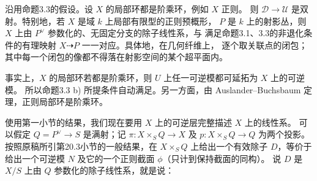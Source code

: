 \begingroup
\def\newscope{V-L}
\def\depth{\operatorname{depth}}
\def\Spec{\operatorname{Spec}}
\def\Ass{\operatorname{Ass}}
\def\OO{\mathcal O}
\def\FF{\mathcal F}
\def\JJ{\mathcal J}

沿用命题3.3的假设。设 \(X\) 的局部环都是阶乘环，例如 \(X\) 正则。
则 \(\mathcal D\to\mathcal U\) 是双射。特别地，若 \(X\) 是域 \(k\) 上局部有限型的正则预概形，
\(P\) 是 \(k\) 上的射影丛，则 \(X\) 上由 \(P^\vee\) 参数化的、无固定分支的除子线性系，与
满足命题3.1、3.3的非退化条件的有理映射 \(X\dashrightarrow P\) 一一对应。具体地，在几何纤维上，
逐个取关联点的闭包；其中每一个闭包的像都不得落在射影空间的某个超平面内。

事实上，\(X\) 的局部环若都是阶乘环，则 \(U\) 上任一可逆模都可延拓为 \(X\) 上的可逆模。
所以命题3.3 b) 所提条件自动满足。另一方面，由 Auslander--Buchsbaum 定理，正则局部环是阶乘环。

使用第一小节的结果，我们现在要用 \(X\) 上的可逆层完整描述 \(X\) 上的线性系。
可以假定 \(Q=P^\vee\to S\) 是满射；记 \(\pi:X\times_S Q\to X\) 及 \(p:X\times_S Q\to Q\) 为两个投影。
按照原稿所引第20.3小节的一般结果，在 \(X\times_S Q\) 上给出一个有效除子 \(D\)，等价于给出一个可逆模 \(N\) 及它的一个正则截面 \(\phi\)（只计到保持截面的同构）。
说 \(D\) 是 \(X/S\) 上由 \(Q\) 参数化的除子线性系，就是说：

